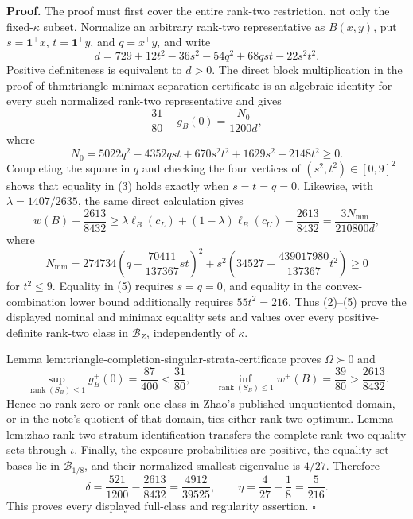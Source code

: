 \textbf{Proof.}
The proof must first cover the entire rank-two restriction, not only the fixed-\(\kappa\) subset.  Normalize an arbitrary rank-two representative as \(B(x,y)\), put \(s=\mathbf1^{\top}x\), \(t=\mathbf1^{\top}y\), and \(q=x^{\top}y\), and write
\[
d=729+12t^2-36s^2-54q^2+68qst-22s^2t^2.
\tag{1}
\]
Positive definiteness is equivalent to \(d>0\).  The direct block multiplication in the proof of thm:triangle-minimax-separation-certificate is an algebraic identity for every such normalized rank-two representative and gives
\[
\frac{31}{80}-g_B(0)=\frac{N_0}{1200d},
\tag{2}
\]
where
\[
N_0=5022q^2-4352qst+670s^2t^2+1629s^2+2148t^2\ge0.
\tag{3}
\]
Completing the square in \(q\) and checking the four vertices of \((s^2,t^2)\in[0,9]^2\) shows that equality in (3) holds exactly when \(s=t=q=0\).  Likewise, with \(\lambda=1407/2635\), the same direct calculation gives
\[
w(B)-\frac{2613}{8432}
\ge
\lambda\ell_B(c_L)+(1-\lambda)\ell_B(c_U)-\frac{2613}{8432}
=\frac{3N_{\mathrm{mm}}}{210800d},
\tag{4}
\]
where
\[
N_{\mathrm{mm}}
=274734\left(q-\frac{70411}{137367}st\right)^2
+s^2\left(34527-\frac{439017980}{137367}t^2\right)\ge0
\tag{5}
\]
for \(t^2\le9\).  Equality in (5) requires \(s=q=0\), and equality in the convex-combination lower bound additionally requires \(55t^2=216\).  Thus (2)--(5) prove the displayed nominal and minimax equality sets and values over every positive-definite rank-two class in \(\mathcal B_Z\), independently of \(\kappa\).

Lemma lem:triangle-completion-singular-strata-certificate proves \(\Omega\succ0\) and
\[
\sup_{\operatorname{rank}(S_B)\le1}g_B^+(0)=\frac{87}{400}<\frac{31}{80},
\qquad
\inf_{\operatorname{rank}(S_B)\le1}w^+(B)=\frac{39}{80}>\frac{2613}{8432}.
\tag{6}
\]
Hence no rank-zero or rank-one class in Zhao's published unquotiented domain, or in the note's quotient of that domain, ties either rank-two optimum.  Lemma lem:zhao-rank-two-stratum-identification transfers the complete rank-two equality sets through \(\iota\).  Finally, the exposure probabilities are positive, the equality-set bases lie in \(\mathcal B_{1/8}\), and their normalized smallest eigenvalue is \(4/27\).  Therefore
\[
\delta=\frac{521}{1200}-\frac{2613}{8432}=\frac{4912}{39525},
\qquad
\eta=\frac4{27}-\frac18=\frac5{216}.
\]
This proves every displayed full-class and regularity assertion. \(\square\)